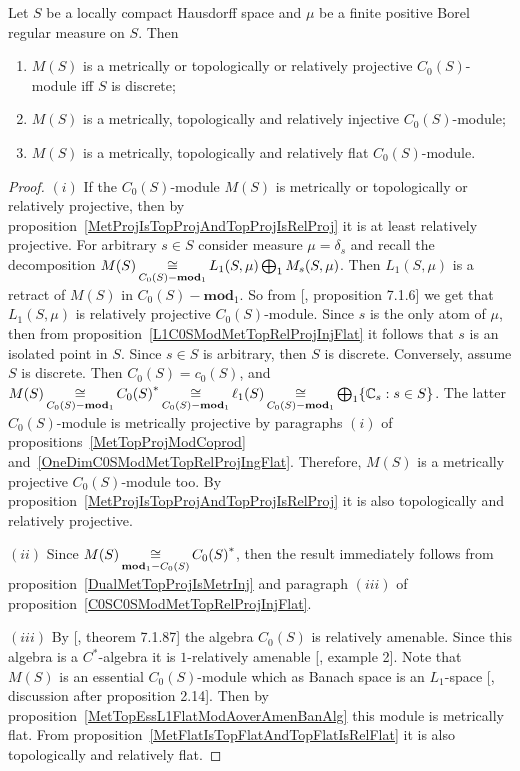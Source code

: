 \begin{proposition}\label{MSC0SModMetTopRelProjIngFlat} Let $S$ be a locally
compact Hausdorff space and $\mu$ be a finite positive Borel regular measure on
$S$. Then

\begin{enumerate}[label = (\roman*)]
    \item $M(S)$ is a metrically or topologically or relatively projective 
    $C_0(S)$-module iff $S$ is discrete; 

    \item $M(S)$ is a metrically, topologically and relatively injective 
    $C_0(S)$-module; 

    \item $M(S)$ is a metrically, topologically and relatively flat 
    $C_0(S)$-module.
\end{enumerate}
\end{proposition}
\begin{proof} $(i)$ If the $C_0(S)$-module $M(S)$ is metrically or topologically 
or relatively projective, then by proposition~\ref{MetProjIsTopProjAndTopProjIsRelProj} 
it is at least relatively projective. For arbitrary $s\in S$ consider measure
$\mu=\delta_s$ and recall the decomposition
$M(S)\mathop{\mathbin{\cong}}\limits_{C_0(S)-\mathbf{mod}_1}L_1(S,\mu)\bigoplus_1 M_s(S,\mu)$. Then
$L_1(S,\mu)$ is a retract of $M(S)$ in $C_0(S)-\mathbf{mod}_1$. So from
[\cite{HelBanLocConvAlg}, proposition 7.1.6] we get that $L_1(S,\mu)$ is
relatively projective $C_0(S)$-module. Since $s$ is the only atom of $\mu$, then
from proposition~\ref{L1C0SModMetTopRelProjInjFlat} it follows that $s$ is an
isolated point in $S$. Since $s\in S$ is arbitrary, then $S$ is discrete.
Conversely, assume $S$ is discrete. Then $C_0(S)=c_0(S)$, and
$M(S)
\mathop{\mathbin{\cong}}\limits_{C_0(S)-\mathbf{mod}_1}{C_0(S)}^*
\mathop{\mathbin{\cong}}\limits_{C_0(S)-\mathbf{mod}_1}\ell_1(S)
\mathop{\mathbin{\cong}}\limits_{C_0(S)-\mathbf{mod}_1}
\bigoplus_1 \{\mathbb{C}_s:s\in S \}$. The latter $C_0(S)$-module is metrically
projective by paragraphs $(i)$ of propositions~\ref{MetTopProjModCoprod}
and~\ref{OneDimC0SModMetTopRelProjIngFlat}. Therefore, $M(S)$ is a metrically
projective $C_0(S)$-module too. By
proposition~\ref{MetProjIsTopProjAndTopProjIsRelProj} it is also topologically
and relatively projective.

$(ii)$ Since $M(S)\mathop{\mathbin{\cong}}\limits_{\mathbf{mod}_1-C_0(S)}{C_0(S)}^*$, then the result
immediately follows from proposition~\ref{DualMetTopProjIsMetrInj} and paragraph
$(iii)$ of proposition~\ref{C0SC0SModMetTopRelProjInjFlat}.

$(iii)$ By [\cite{HelBanLocConvAlg}, theorem 7.1.87] the algebra $C_0(S)$ is
relatively amenable. Since this algebra is a $C^*$-algebra it is $1$-relatively 
amenable [\cite{RundeAmenConstFour}, example 2]. Note that $M(S)$ is 
an essential $C_0(S)$-module which as Banach space is an $L_1$-space
[\cite{DalLauSecondDualOfMeasAlg}, discussion after proposition 2.14]. Then by
proposition~\ref{MetTopEssL1FlatModAoverAmenBanAlg} this module is metrically
flat. From proposition~\ref{MetFlatIsTopFlatAndTopFlatIsRelFlat} it is also
topologically and relatively flat.
\end{proof}

